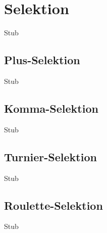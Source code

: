 



\section{Selektion}
Stub

\subsection{Plus-Selektion}
Stub

\subsection{Komma-Selektion}
Stub

\subsection{Turnier-Selektion}
Stub

\subsection{Roulette-Selektion}
Stub

